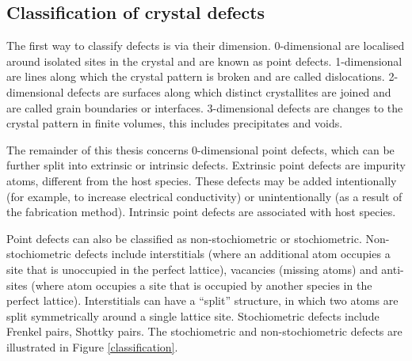 \subsection{Classification of crystal defects}

The first way to classify defects is via their dimension. 0-dimensional are localised around isolated sites in the crystal and are known as point defects. 1-dimensional are lines along which the crystal pattern is broken and are called dislocations. 2-dimensional defects are surfaces along which distinct crystallites are joined and are called grain boundaries or interfaces. 3-dimensional defects are changes to the crystal pattern in finite volumes, this includes precipitates and voids. 

The remainder of this thesis concerns 0-dimensional point defects, which can be further split into extrinsic or intrinsic defects. Extrinsic point defects are impurity atoms, different from the host species. These defects may be added intentionally (for example, to increase electrical conductivity) or unintentionally (as a result of the fabrication method). Intrinsic point defects are associated with host species.

Point defects can also be classified as non-stochiometric or stochiometric. Non-stochiometric defects include interstitials (where an additional atom occupies a site that is unoccupied in the perfect lattice), vacancies (missing atoms) and anti-sites (where atom occupies a site that is occupied by another species in the perfect lattice). Interstitials can have a ``split'' structure, in which two atoms are split symmetrically around a single lattice site. Stochiometric defects include Frenkel pairs, Shottky pairs. The stochiometric and non-stochiometric defects are illustrated in Figure \ref{classification}.

